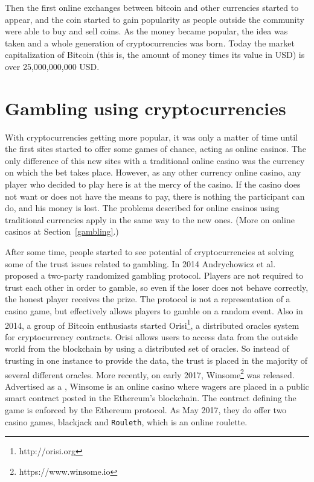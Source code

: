 Then the first online exchanges between bitcoin and other currencies started
  to appear, and the coin started to gain popularity as people outside the
  community were able to buy and sell coins.
As the money became popular, the idea was taken and a whole generation of
  cryptocurrencies was born.
Today the market capitalization of Bitcoin (this is, the amount of money times
  its value in USD) is over 25,000,000,000 USD.

\section{Gambling using cryptocurrencies}

With cryptocurrencies getting more popular, it was only a matter of time until
  the first sites started to offer some games of chance, acting as online
  casinos.
The only difference of this new sites with a traditional online casino was the
  currency on which the bet takes place.
However, as any other currency online casino, any player who decided to play
  here is at the mercy of the casino.
If the casino does not want or does not have the means to pay, there is nothing
  the participant can do, and his money is lost.
The problems described for online casinos using traditional currencies apply in
the same way to the new ones.
(More on online casinos at Section~\ref{gambling}.)

After some time, people started to see potential of cryptocurrencies at solving
  some of the trust issues related to gambling.
In 2014 Andrychowicz et al.  proposed a
  two-party randomized gambling protocol.
Players are not required to trust each other in order to gamble, so even if the
  loser does not behave correctly, the honest player receives the prize.
The protocol is not a representation of a casino game, but effectively allows
  players to gamble on a random event.
Also in 2014, a group of Bitcoin enthusiasts started
  Orisi\footnote{http://orisi.org}, a distributed oracles system for
  cryptocurrency contracts.
Orisi allows users to access data from the outside world from the blockchain
  by using a distributed set of oracles. So instead of trusting in one instance
  to provide the data, the trust is placed in the majority of several different
  oracles.
More recently, on early 2017, Winsome\footnote{https://www.winsome.io} was
  released. Advertised as a , Winsome
  is an online casino where wagers are placed in a public smart contract posted
  in the Ethereum's blockchain.
The contract defining the game is enforced by the Ethereum protocol.
As May 2017, they do offer two casino games, blackjack and \texttt{Rouleth},
  which is an online roulette.

